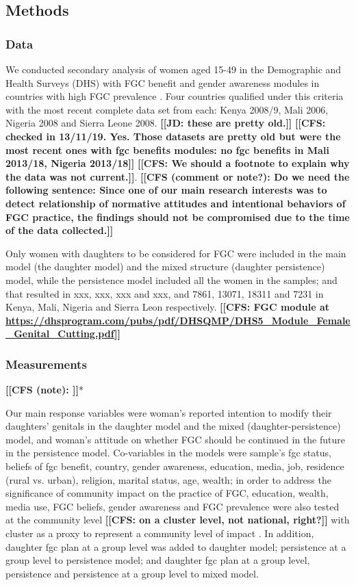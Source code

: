 \documentclass[12pt,]{article}
\newcommand{\comment}[1]{\textbf{[[#1]]}}
\newcommand{\cfcmt}[1]{\comment{CFS: #1}}
\newcommand{\cfonly}[1]{\comment{CFS (note): #1}}
\newcommand{\cf}[1]{\comment{CFS (comment or note?): #1}}
\newcommand{\jdcmt}[1]{\comment{JD: #1}}
\begin{document}
\subsection{Methods}\label{methods}

\subsubsection{Data}\label{data}

We conducted secondary analysis of women aged 15-49 in the Demographic and Health Surveys (DHS) with FGC benefit and gender awareness modules in countries with high FGC prevalence \cite{UNIC16}. Four countries qualified under this criteria with the most recent complete data set from each: Kenya 2008/9, Mali 2006, Nigeria 2008 and Sierra Leone 2008.  \jdcmt{these are pretty old.} \cfcmt{checked in 13/11/19.  Yes.  Those datasets are pretty old but were the most recent ones with fgc benefits modules: no fgc benefits in Mali 2013/18, Nigeria 2013/18} \cfcmt{We should a footnote to explain why the data was not current.}.  \cf{Do we need the following sentence:  Since one of our main research interests was to detect relationship of normative attitudes and intentional behaviors of FGC practice, the findings should not be compromised due to the time of the data collected.}

Only women with daughters to be considered for FGC were included in the main model (the daughter model) and the mixed structure (daughter persistence) model, while the persistence model included all the women in the samples; and that resulted in xxx, xxx, xxx and xxx, and 7861, 13071, 18311 and 7231 in Kenya, Mali, Nigeria and Sierra Leon respectively.  \cfcmt{FGC module at \url{https://dhsprogram.com/pubs/pdf/DHSQMP/DHS5_Module_Female_Genital_Cutting.pdf}}

\subsubsection{Measurements}\label{measurements}

\cfonly{\cite{Rima08}}*

Our main response variables were woman's reported intention to modify their daughters’ genitals in the daughter model and the mixed (daughter-persistence) model, and woman's attitude on whether FGC should be continued in the future in the persistence model.  Co-variables in the models were sample’s fgc status, beliefs of fgc benefit, country, gender awareness, education, media, job, residence (rural vs. urban), religion, marital status, age, wealth; in order to address the significance of community impact on the practice of FGC, education, wealth, media use, FGC beliefs, gender awareness and FGC prevalence were also tested at the community level \cfcmt{on a cluster level, not national, right?} with cluster as a proxy to represent a community level of impact \cite{AligRen06, BoylSvec19, Hayf05, Krav02}.  In addition, daughter fgc plan at a group level was added to daughter model; persistence at a group level to persistence model; and daughter fgc plan at a group level, persistence and persistence at a group level to mixed model.
\end{document}
